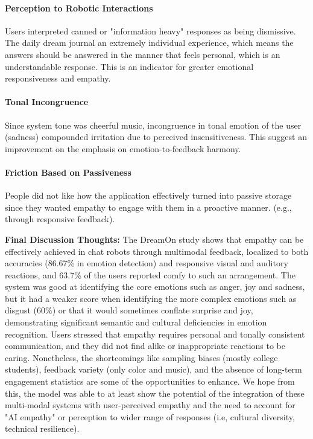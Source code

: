 \documentclass[conference]{IEEEtran}
\begin{document}
\paragraph{\textbf{Perception to Robotic Interactions}}

 Users interpreted canned or "information heavy" responses as being dismissive. The daily dream journal  an extremely individual experience, which means the answers should be answered in the manner that feels personal, which is an understandable response. This is an indicator for greater emotional responsiveness and empathy.

\paragraph{\textbf{Tonal Incongruence}} Since system tone was cheerful music, incongruence in tonal emotion of the user (sadness) compounded irritation due to perceived insensitiveness. This suggest an improvement on the emphasis on emotion-to-feedback harmony.

\paragraph{\textbf{Friction Based on Passiveness}} People did not like how the application effectively turned into passive storage since they wanted empathy to engage with them in a proactive manner. (e.g., through responsive feedback).\newline

\textbf{Final Discussion Thoughts:}\newline
The DreamOn study shows that empathy can be effectively achieved in chat robots through multimodal feedback, localized to both accuracies (86.67\% in emotion detection) and responsive visual and auditory reactions, and 63.7\% of the users reported comfy to such an arrangement. The system was good at identifying the core emotions such as anger, joy and sadness, but it had a weaker score when identifying the more complex emotions such as disgust (60\%) or that it would sometimes conflate surprise and joy, demonstrating significant semantic and cultural deficiencies in emotion recognition. Users stressed that empathy requires personal and tonally consistent communication, and they did not find alike or inappropriate reactions to be caring. Nonetheless, the shortcomings like sampling biases (mostly college students), feedback variety (only color and music), and the absence of long-term engagement statistics are some of the opportunities to enhance. We hope from this, the model was able to at least show the potential of the integration of these multi-modal systems with user-perceived empathy and the need to account for "AI empathy" or perception to wider range of responses (i.e, cultural diversity, technical resilience).
\end{document}
